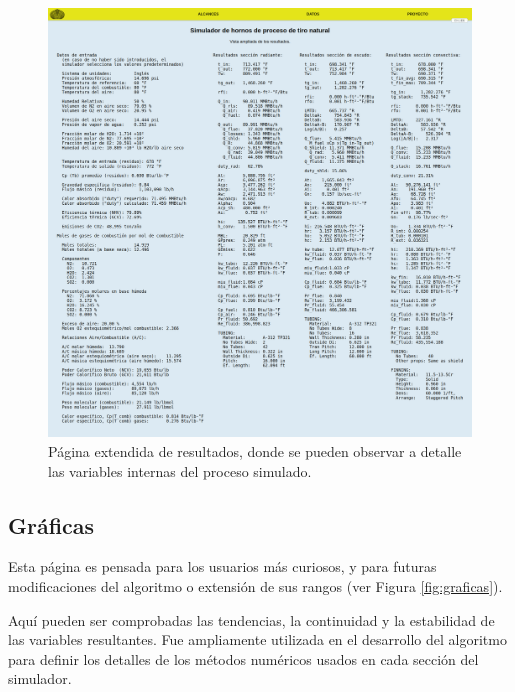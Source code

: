 \begin{figure}[hbt]
\begin{center}
\includegraphics[scale=0.18]{images/fullresultados.png}
\caption[Página extendida de resultados]{Página extendida de resultados, donde se pueden observar a detalle las variables internas del proceso simulado.}
\label{fig:fullresultados}
\end{center}
\end{figure}

\subsection{Gráficas}

\par Esta página es pensada para los usuarios más curiosos, y para futuras modificaciones del algoritmo o extensión de sus rangos (ver Figura \ref{fig:graficas}).

\par Aquí pueden ser comprobadas las tendencias, la continuidad y la estabilidad de las variables resultantes. Fue ampliamente utilizada en el desarrollo del algoritmo para definir los detalles de los métodos numéricos usados en cada sección del simulador.

